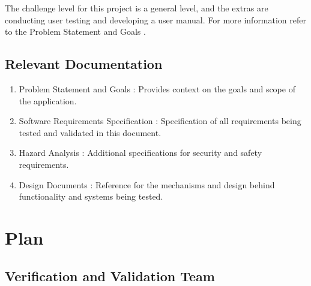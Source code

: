 \documentclass[12pt, titlepage]{article}
\begin{document}
The challenge level for this project is a general level, and the
extras are conducting user testing and developing a user manual. For
more information refer to the Problem Statement and Goals
\citep[\textit{Challenge Level and Extras}]{ProblemStatement}.

\subsection{Relevant Documentation}

\begin{enumerate}
  \item Problem Statement and Goals \citep{ProblemStatement}:
    Provides context on the goals and scope of the application.
  \item Software Requirements Specification :
    Specification of all requirements being tested and validated in
    this document.
  \item Hazard Analysis : Additional
    specifications for security and safety requirements.
  \item Design Documents : Reference for the
    mechanisms and design behind functionality and systems being tested.
\end{enumerate}

\section{Plan}


\subsection{Verification and Validation Team}
\end{document}
